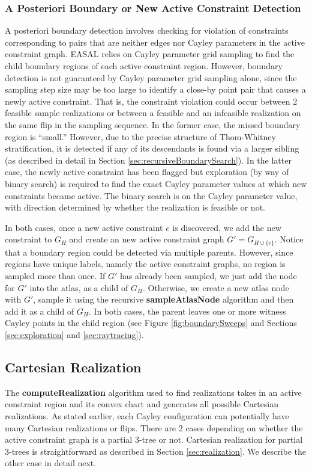 \subsubsection{A Posteriori Boundary or New Active Constraint Detection}
\label{sec:aposteriori}
A posteriori boundary detection involves checking for violation of constraints
corresponding to pairs that are neither edges nor Cayley parameters in the
active constraint graph. EASAL relies on Cayley parameter grid sampling to find
the child boundary regions of each active constraint region. However, boundary
detection is not guaranteed by Cayley parameter grid sampling alone, since the
sampling step size may be too large to identify a close-by point pair that
causes a newly active constraint. That is, the constraint violation could occur
between 2 feasible sample realizations or between a feasible and an infeasible
realization on the same flip in the sampling sequence. In the former case, the
missed boundary region is ``small.'' However, due to the precise structure of
Thom-Whitney stratification, it is detected if any of its descendants is found
via a larger sibling (as described in detail in Section
\ref{sec:recursiveBoundarySearch}). In the latter case, the newly active
constraint has been flagged but exploration (by way of binary search) is
required to find the exact Cayley parameter values at which new constraints
became active. The binary search is on the Cayley parameter value, with
direction determined by whether the realization is feasible or not.


In both cases, once a new active constraint $e$ is discovered, we add the new
constraint to $G_H$ and create an new active constraint graph $G' = G_{H \cup
\{e\}}$.  Notice that a boundary region could be detected via multiple
parents.
However, since regions have unique labels, namely the active constraint graphs,
no region is sampled more than once. If $G'$ has already been sampled, we just
add the node for $G'$ into the atlas, as a child of $G_H$. Otherwise, we create
a new atlas node with $G'$, sample it using the recursive
\textbf{sampleAtlasNode} algorithm and then add it as a child of $G_H$.
In both cases, the parent leaves one or more witness Cayley points in the 
child region (see Figure \ref{fig:boundarySweeps} and Sections
    \ref{sec:exploration} and \ref{sec:raytracing}).



\subsection{Cartesian Realization}
\label{sec:algRealization}
The \textbf{computeRealization} algorithm used to find realizations takes in an
active constraint region and its convex chart and generates all possible
Cartesian realizations. As stated earlier, each Cayley configuration can
potentially have many Cartesian realizations or flips. There are 2 cases
depending on whether the active constraint graph is a partial 3-tree or not.
Cartesian realization for partial 3-trees is straightforward as described in
Section \ref{sec:realization}. We describe the other case in detail next.



